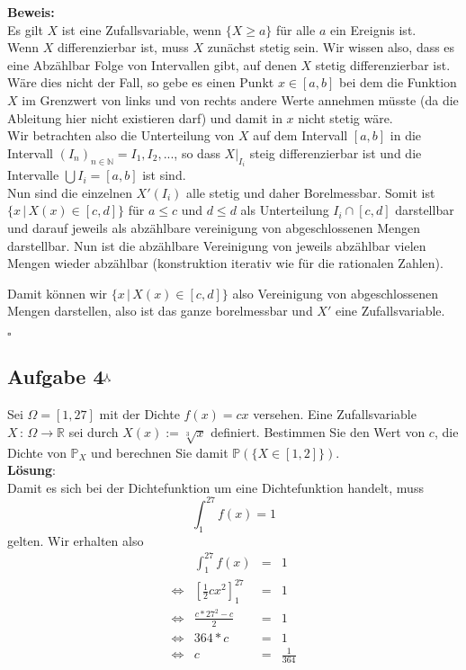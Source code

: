 \documentclass[11pt,a4paper,ngerman]{article}
\newcommand{\maxw}{$^\curlywedgedownarrow$}
\begin{document}
\textbf{Beweis:}\\

Es gilt $X$ ist eine Zufallsvariable, wenn $\{X \geq a\}$ für alle $a$ ein Ereignis ist.\\

Wenn $X$ differenzierbar ist, muss $X$ zunächst stetig sein. Wir wissen also, dass es eine Abzählbar Folge von Intervallen gibt,
auf denen $X$ stetig differenzierbar ist. Wäre dies nicht der Fall, so gebe es einen Punkt $x \in [a,b]$ bei dem die Funktion $X$ im Grenzwert von links und von
rechts andere Werte annehmen müsste (da die Ableitung hier nicht existieren darf) und damit in $x$ nicht stetig wäre.\\

Wir betrachten also die Unterteilung von $X$ auf dem Intervall $[a,b]$ in die Intervall $(I_n)_{n\in\mathbb{N}} = I_1, I_2, ...$, so dass $X |_{I_i}$ steig differenzierbar ist
und die Intervalle $\bigcup I_i = [a,b]$ ist sind.\\

Nun sind die einzelnen $X'(I_i)$ alle stetig und daher Borelmessbar. Somit ist $\{x \, | \, X(x) \in [c,d]\}$ für $a\leq c$ und $d \leq d$ als Unterteilung $I_i \cap [c,d]$
darstellbar und darauf jeweils als abzählbare vereinigung von abgeschlossenen Mengen darstellbar. Nun ist die abzählbare Vereinigung von jeweils abzählbar vielen Mengen
wieder abzählbar (konstruktion iterativ wie für die rationalen Zahlen).

Damit können wir $\{x \, | \, X(x) \in [c,d]\}$ also Vereinigung von abgeschlossenen Mengen darstellen, also ist das ganze borelmessbar und $X'$ eine Zufallsvariable.

\mbox{}\hfill$\square$

\subsection*{Aufgabe 4\maxw}

Sei $\Omega = [1,27]$ mit der Dichte $f(x) = cx$ versehen. Eine Zufallsvariable $X \, : \, \Omega \rightarrow \mathbb{R}$ sei durch $X(x) := \sqrt[3]{x}$ definiert.
Bestimmen Sie den Wert von $c$, die Dichte von $\mathbb{P}_X$ und berechnen Sie damit $\mathbb{P}(\{X \in [1,2]\})$.\\

\textbf{Lösung}:\\

Damit es sich bei der Dichtefunktion um eine Dichtefunktion handelt, muss
\[
    \int_1^{27} f(x) = 1
\]
gelten.
Wir erhalten also
$$\begin{array}{crcl}
                & \int_1^{27} f(x) &=& 1\\
\Leftrightarrow & \left[ \frac{1}{2} cx^2\right]_1^{27} & = & 1\\
\Leftrightarrow & \frac{c*27^2 - c}{2} & = & 1\\
\Leftrightarrow & 364 * c &=& 1\\
\Leftrightarrow & c &=& \frac{1}{364}
\end{array}$$
\end{document}
